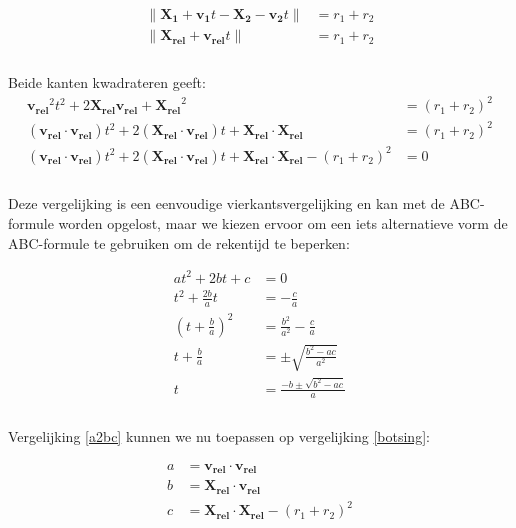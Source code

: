 \documentclass[12pt,a4paper]{article}
\begin{document}
	\begin{equation}
		\begin{aligned}
			 \|\mathbf{X_1} + \mathbf{v_1}t  - \mathbf{X_2} -  \mathbf{v_2}t \| &= r_1 + r_2 \\
			 \|\mathbf{X_{rel}} + \mathbf{v_{rel}}t \| &= r_1 + r_2\\
		\end{aligned}
	\end{equation}
	\\Beide kanten kwadrateren geeft:
	\begin{equation}
		\label{botsing}
		\begin{aligned}
			\mathbf{v_{rel}}^2 t^2 + 2 \mathbf{X_{rel}} \mathbf{v_{rel}} + \mathbf{X_{rel}}^2  &= (r_1 + r_2)^2 \\
			(\mathbf{v_{rel}} \cdot \mathbf{v_{rel}})t^2 + 2(\mathbf{X_{rel}} \cdot \mathbf{v_{rel}})t + \mathbf{X_{rel}} \cdot \mathbf{X_{rel}} &= (r_1 + r_2)^2 \\
			(\mathbf{v_{rel}} \cdot \mathbf{v_{rel}})t^2 + 2(\mathbf{X_{rel}} \cdot \mathbf{v_{rel}})t + \mathbf{X_{rel}} \cdot \mathbf{X_{rel}} - (r_1 + r_2)^2 &= 0\\
		\end{aligned}
	\end{equation}
	\\Deze vergelijking is een eenvoudige vierkantsvergelijking en kan met de ABC-formule worden opgelost, maar we kiezen ervoor om een iets alternatieve vorm de ABC-formule te gebruiken om de rekentijd te beperken:
	
	\begin{equation}
		\label{a2bc}
		\begin{aligned}
			at^2+2bt+c &= 0 \\
			t^2+\tfrac{2b}{a}t &= -\frac{c}{a} \\
			\left( t+\tfrac{b}{a} \right)^2 &= \frac{b^2}{a^2} -\frac{c}{a} \\
			t + \tfrac{b}{a} &= \pm \sqrt{\frac{b^2 - ac}{a^2}} \\
			t &= \frac{-b \pm \sqrt{b^2 - ac}}{a}\\
		\end{aligned}
	\end{equation}
	\\Vergelijking \eqref{a2bc} kunnen we nu toepassen op vergelijking \eqref{botsing}:
	
	\begin{equation}
		\begin{aligned}
			a &= \mathbf{v_{rel}} \cdot \mathbf{v_{rel}} \\
			b &= \mathbf{X_{rel}} \cdot \mathbf{v_{rel}} \\
			c &= \mathbf{X_{rel}} \cdot \mathbf{X_{rel}} - (r_1 + r_2)^2\\
		\end{aligned}
	\end{equation}
	
\end{document}
